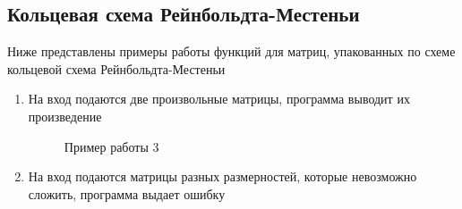 \documentclass[12pt, a4paper]{article}
\begin{document}
\subsection{Кольцевая схема Рейнбольдта-Местеньи}
Ниже представлены примеры работы функций для матриц, упакованных по схеме 
кольцевой схема Рейнбольдта-Местеньи
\begin{enumerate}
	\item На вход подаются две произвольные матрицы, программа выводит их 
	произведение	
	\begin{figure}[h]
  		\caption{Пример работы 3}
	\end{figure}
	\newpage
	\item На вход подаются матрицы разных размерностей, которые невозможно 
	сложить, программа выдает ошибку
	\begin{figure}[h]

\end{figure}
\end{enumerate}
\end{document}
